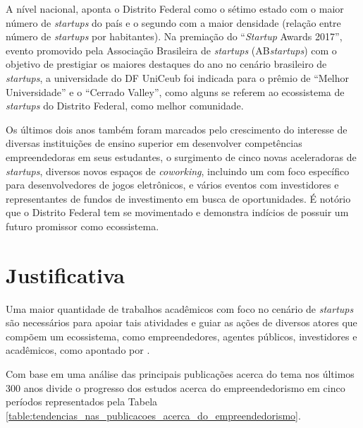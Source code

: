 A nível nacional,  aponta o Distrito Federal como o sétimo estado com o maior número de \textit{startups} do país e o segundo com a maior densidade (relação entre número de \textit{startups} por habitantes). Na premiação do ``\textit{Startup} Awards 2017'', evento promovido pela Associação Brasileira de \textit{startups} (AB\textit{startups}) com o objetivo de prestigiar os maiores destaques do ano no cenário brasileiro de \textit{startups}, a universidade do DF UniCeub foi indicada para o prêmio de ``Melhor Universidade'' e o ``Cerrado Valley'', como alguns se referem ao ecossistema de \textit{startups} do Distrito Federal, como melhor comunidade. 

Os últimos dois anos também foram marcados pelo crescimento do interesse de diversas instituições de ensino superior em desenvolver competências empreendedoras em seus estudantes, o surgimento de cinco novas aceleradoras de \textit{startups}, diversos novos espaços de \textit{coworking}, incluindo um com foco específico para desenvolvedores de jogos eletrônicos, e vários eventos com investidores e representantes de fundos de investimento em busca de oportunidades. É notório que o Distrito Federal tem se movimentado e demonstra indícios de possuir um futuro promissor como ecossistema.

\section{Justificativa}
\label{section:justificativa}

Uma maior quantidade de trabalhos acadêmicos com foco no cenário de \textit{startups} são necessários para apoiar tais atividades e guiar as ações de diversos atores que compõem um ecossistema, como empreendedores, agentes públicos, investidores e acadêmicos, como apontado por .

Com base em uma análise das principais publicações acerca do tema nos últimos 300 anos  divide o progresso dos estudos acerca do empreendedorismo em cinco períodos representados pela Tabela \ref{table:tendencias_nas_publicacoes_acerca_do_empreendedorismo}.

